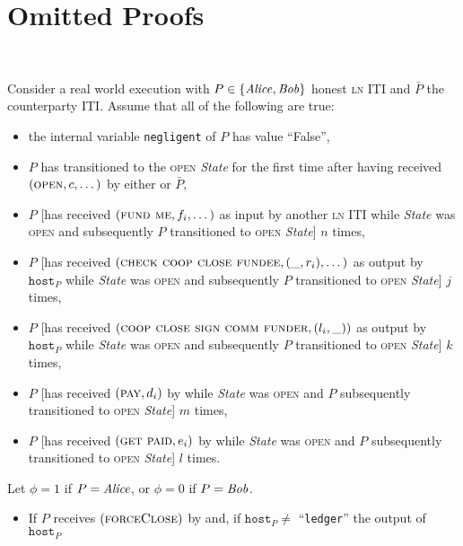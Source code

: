 \section{Omitted Proofs} \ \\
\label{sec:proofs}

\begin{lemma}
\label{lemma:real-balance-security}
  Consider a real world execution with $P \in \{\mathit{Alice}, \mathit{Bob}\}$ honest
  \textsc{ln} ITI and $\bar{P}$ the counterparty ITI. Assume that all of the
  following are true:
  \begin{itemize}
    \item the internal variable \texttt{negligent} of $P$ has value ``False'',
    \item $P$ has transitioned to the \textsc{open} \textit{State} for the first
    time after having received $(\textsc{open}, c, \dots)$ by either
    \environment or $\bar{P}$,
    \item $P$ [has received $(\textsc{fund me}, f_i, \dots)$ as input by another
    \textsc{ln} ITI while \textit{State} was \textsc{open} and subsequently $P$
    transitioned to \textsc{open} \textit{State}] $n$ times,
    \item $P$ [has received $(\textsc{check coop close fundee}, (\_, r_i),
    \dots)$ as output by $\texttt{host}_P$ while \textit{State} was
    \textsc{open} and subsequently $P$ transitioned to \textsc{open}
    \textit{State}] $j$ times,
    \item $P$ [has received $(\textsc{coop close sign comm funder}, (l_i, \_))$
    as output by $\texttt{host}_P$ while \textit{State} was \textsc{open} and
    subsequently $P$ transitioned to \textsc{open} \textit{State}] $k$ times,
    \item $P$ [has received $(\textsc{pay}, d_i)$ by \environment while
    \textit{State} was \textsc{open} and $P$ subsequently transitioned to
    \textsc{open} \textit{State}] $m$ times,
    \item $P$ [has received $(\textsc{get paid}, e_i)$ by \environment while
    \textit{State} was \textsc{open} and $P$ subsequently transitioned to
    \textsc{open} \textit{State}] $l$ times.
  \end{itemize}
  Let $\phi = 1$ if $P = \mathit{Alice}$, or $\phi = 0$ if $P = \mathit{Bob}$.
  \begin{itemize}
    \item If $P$ receives $(\textsc{forceClose})$ by \environment and, if
    $\texttt{host}_P \neq$ ``\texttt{ledger}'' the output of $\texttt{host}_P$

\end{itemize}
\end{lemma}
